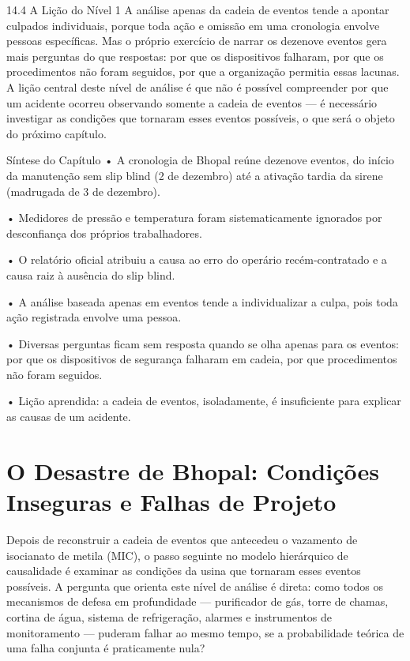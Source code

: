 14.4 A Lição do Nível 1 A análise apenas da cadeia de eventos tende a apontar culpados individuais, porque toda ação e omissão em uma cronologia envolve pessoas específicas. Mas o próprio exercício de narrar os dezenove eventos gera mais perguntas do que respostas: por que os dispositivos falharam, por que os procedimentos não foram seguidos, por que a organização permitia essas lacunas. A lição central deste nível de análise é que não é possível compreender por que um acidente ocorreu observando somente a cadeia de eventos — é necessário investigar as condições que tornaram esses eventos possíveis, o que será o objeto do próximo capítulo.

Síntese do Capítulo • A cronologia de Bhopal reúne dezenove eventos, do início da manutenção sem slip blind (2 de dezembro) até a ativação tardia da sirene (madrugada de 3 de dezembro).

• Medidores de pressão e temperatura foram sistematicamente ignorados por desconfiança dos próprios trabalhadores.

• O relatório oficial atribuiu a causa ao erro do operário recém-contratado e a causa raiz à ausência do slip blind.

• A análise baseada apenas em eventos tende a individualizar a culpa, pois toda ação registrada envolve uma pessoa.

• Diversas perguntas ficam sem resposta quando se olha apenas para os eventos: por que os dispositivos de segurança falharam em cadeia, por que procedimentos não foram seguidos.

• Lição aprendida: a cadeia de eventos, isoladamente, é insuficiente para explicar as causas de um acidente.

\chapter{O Desastre de Bhopal: Condições Inseguras e Falhas de Projeto}

Depois de reconstruir a cadeia de eventos que antecedeu o vazamento de isocianato de metila (MIC), o passo seguinte no modelo hierárquico de causalidade é examinar as condições da usina que tornaram esses eventos possíveis. A pergunta que orienta este nível de análise é direta: como todos os mecanismos de defesa em profundidade — purificador de gás, torre de chamas, cortina de água, sistema de refrigeração, alarmes e instrumentos de monitoramento — puderam falhar ao mesmo tempo, se a probabilidade teórica de uma falha conjunta é praticamente nula?

